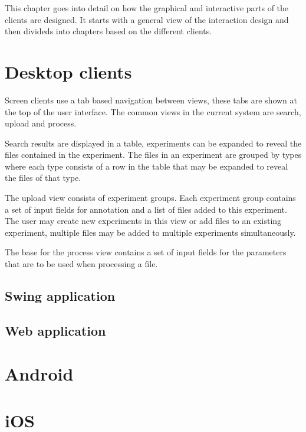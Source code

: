 
This chapter goes into detail on how the graphical and interactive parts of the clients are designed. It starts with a general view of the interaction design and then divideds into chapters based on the different clients.

\section{Desktop clients}
Screen clients use a tab based navigation between views, these tabs are shown at the top of the user interface. The common views in the current system are search, upload and process.

Search results are displayed in a table, experiments can be expanded to reveal the files contained in the experiment. The files in an experiment are grouped by types where each type consists of a row in the table that may be expanded to reveal the files of that type.

The upload view consists of experiment groups. Each experiment group contains a set of input fields for annotation and a list of files added to this experiment. The user may create new experiments in this view or add files to an existing experiment, multiple files may be added to multiple experiments simultaneously.

The base for the process view contains a set of input fields for the parameters that are to be used when processing a file.

\FloatBarrier
\subsection{Swing application}


\FloatBarrier
\subsection{Web application}


\FloatBarrier

\section{Android}

\FloatBarrier
\section{iOS}


